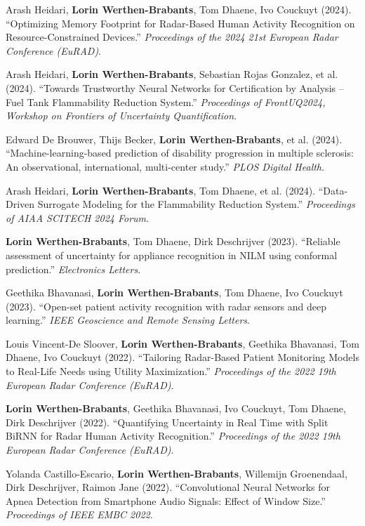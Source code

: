\documentclass[10.5pt,a4paper]{article}
\begin{document}
\begin{enumerate}[leftmargin=1.4em, itemsep=4pt, topsep=2pt, label={[\arabic*]}]
\item Arash Heidari, \textbf{Lorin Werthen-Brabants}, Tom Dhaene, Ivo Couckuyt (2024). ``Optimizing Memory Footprint for Radar-Based Human Activity Recognition on Resource-Constrained Devices.'' \textit{Proceedings of the 2024 21st European Radar Conference (EuRAD)}.
\item Arash Heidari, \textbf{Lorin Werthen-Brabants}, Sebastian Rojas Gonzalez, et al. (2024). ``Towards Trustworthy Neural Networks for Certification by Analysis -- Fuel Tank Flammability Reduction System.'' \textit{Proceedings of FrontUQ2024, Workshop on Frontiers of Uncertainty Quantification}.
\item Edward De Brouwer, Thijs Becker, \textbf{Lorin Werthen-Brabants}, et al. (2024). ``Machine-learning-based prediction of disability progression in multiple sclerosis: An observational, international, multi-center study.'' \textit{PLOS Digital Health}.
\item Arash Heidari, \textbf{Lorin Werthen-Brabants}, Tom Dhaene, et al. (2024). ``Data-Driven Surrogate Modeling for the Flammability Reduction System.'' \textit{Proceedings of AIAA SCITECH 2024 Forum}.
\item \textbf{Lorin Werthen-Brabants}, Tom Dhaene, Dirk Deschrijver (2023). ``Reliable assessment of uncertainty for appliance recognition in NILM using conformal prediction.'' \textit{Electronics Letters}.
\item Geethika Bhavanasi, \textbf{Lorin Werthen-Brabants}, Tom Dhaene, Ivo Couckuyt (2023). ``Open-set patient activity recognition with radar sensors and deep learning.'' \textit{IEEE Geoscience and Remote Sensing Letters}.
\item Louis Vincent-De Sloover, \textbf{Lorin Werthen-Brabants}, Geethika Bhavanasi, Tom Dhaene, Ivo Couckuyt (2022). ``Tailoring Radar-Based Patient Monitoring Models to Real-Life Needs using Utility Maximization.'' \textit{Proceedings of the 2022 19th European Radar Conference (EuRAD)}.
\item \textbf{Lorin Werthen-Brabants}, Geethika Bhavanasi, Ivo Couckuyt, Tom Dhaene, Dirk Deschrijver (2022). ``Quantifying Uncertainty in Real Time with Split BiRNN for Radar Human Activity Recognition.'' \textit{Proceedings of the 2022 19th European Radar Conference (EuRAD)}.
\item Yolanda Castillo-Escario, \textbf{Lorin Werthen-Brabants}, Willemijn Groenendaal, Dirk Deschrijver, Raimon Jane (2022). ``Convolutional Neural Networks for Apnea Detection from Smartphone Audio Signals: Effect of Window Size.'' \textit{Proceedings of IEEE EMBC 2022}.

\end{enumerate}
\end{document}
